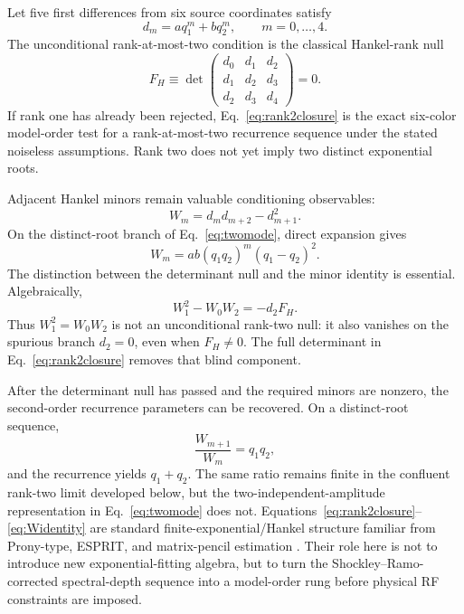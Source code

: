 \documentclass[11pt]{article}
\begin{document}
Let five first differences from six source coordinates satisfy
\begin{equation}
d_m=a q_1^m+b q_2^m,
\qquad m=0,\ldots,4.
\label{eq:twomode}
\end{equation}
The unconditional rank-at-most-two condition is the classical Hankel-rank null
\begin{equation}
\boxed{
F_H\equiv
\det
\begin{pmatrix}
d_0&d_1&d_2\\
d_1&d_2&d_3\\
d_2&d_3&d_4
\end{pmatrix}=0.}
\label{eq:rank2closure}
\end{equation}
If rank one has already been rejected, Eq.~\eqref{eq:rank2closure} is the exact six-color model-order test for a rank-at-most-two recurrence sequence under the stated noiseless assumptions. Rank two does not yet imply two distinct exponential roots.

Adjacent Hankel minors remain valuable conditioning observables:
\begin{equation}
W_m=d_md_{m+2}-d_{m+1}^2.
\end{equation}
On the distinct-root branch of Eq.~\eqref{eq:twomode}, direct expansion gives
\begin{equation}
\boxed{W_m=ab(q_1q_2)^m(q_1-q_2)^2.}
\label{eq:Widentity}
\end{equation}
The distinction between the determinant null and the minor identity is essential. Algebraically,
\begin{equation}
\boxed{W_1^2-W_0W_2=-d_2F_H.}
\label{eq:minor_factorization}
\end{equation}
Thus $W_1^2=W_0W_2$ is not an unconditional rank-two null: it also vanishes on the spurious branch $d_2=0$, even when $F_H\neq0$. The full determinant in Eq.~\eqref{eq:rank2closure} removes that blind component.

After the determinant null has passed and the required minors are nonzero, the second-order recurrence parameters can be recovered. On a distinct-root sequence,
\begin{equation}
\frac{W_{m+1}}{W_m}=q_1q_2,
\end{equation}
and the recurrence yields $q_1+q_2$. The same ratio remains finite in the confluent rank-two limit developed below, but the two-independent-amplitude representation in Eq.~\eqref{eq:twomode} does not. Equations~\eqref{eq:rank2closure}--\eqref{eq:Widentity} are standard finite-exponential/Hankel structure familiar from Prony-type, ESPRIT, and matrix-pencil estimation \cite{Prony1795,RoyKailath1989,HuaSarkar1990}. Their role here is not to introduce new exponential-fitting algebra, but to turn the Shockley--Ramo-corrected spectral-depth sequence into a model-order rung before physical RF constraints are imposed.
\end{document}
